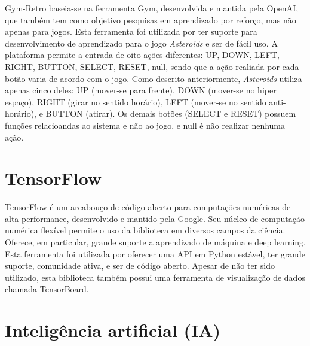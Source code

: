 Gym-Retro baseia-se na ferramenta Gym, desenvolvida e mantida pela OpenAI, que também tem como objetivo pesquisas em aprendizado por reforço, mas não apenas para jogos.
Esta ferramenta foi utilizada por ter suporte para desenvolvimento de aprendizado para o jogo \textit{Asteroids} e ser de fácil uso. A plataforma permite a entrada de oito ações diferentes: UP, DOWN, LEFT, RIGHT, BUTTON, SELECT, RESET, null, sendo que a ação realiada por cada botão varia de acordo com o jogo. Como descrito anteriormente, \textit{Asteroids} utiliza apenas cinco deles: UP (mover-se para frente), DOWN (mover-se no hiper espaço), RIGHT (girar no sentido horário), LEFT (mover-se no sentido anti-horário), e BUTTON (atirar). Os demais botões (SELECT e RESET) possuem funções relacioandas ao sistema e não ao jogo, e null é não realizar nenhuma ação.

\section{TensorFlow}
\label{sec:tensorflow}

TensorFlow é um arcabouço de código aberto para computações numéricas de alta performance, desenvolvido e mantido pela Google. Seu núcleo de computação numérica flexível permite o uso da biblioteca em diversos campos da ciência. Oferece, em particular, grande suporte a aprendizado de máquina e deep learning.
Esta ferramenta foi utilizada por oferecer uma API em Python estável, ter grande suporte, comunidade ativa, e ser de código aberto.
Apesar de não ter sido utilizado, esta biblioteca também possui uma ferramenta de visualização de dados chamada TensorBoard.

% 
\section{Inteligência artificial (IA)}
\label{sec:ia}

